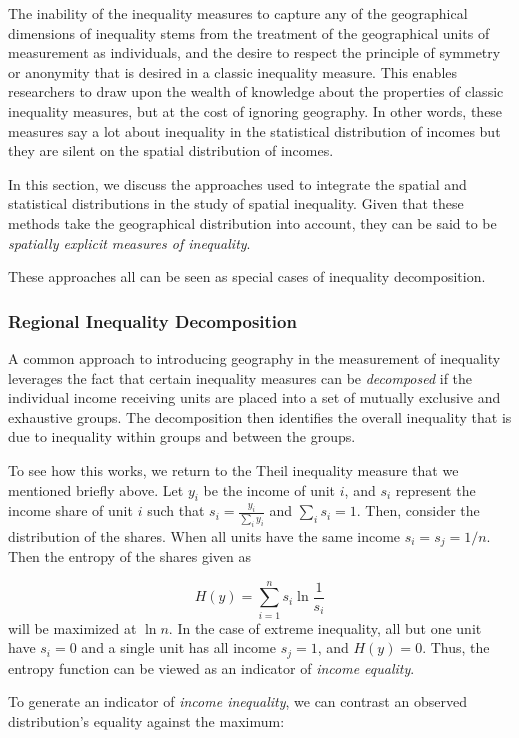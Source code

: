 \documentclass[
  a4paper, 
  twoside,
  final
]{article}
\begin{document}
The inability of the inequality measures to capture any of the
geographical dimensions of inequality stems from the treatment of the
geographical units of measurement as individuals, and the desire to
respect the principle of symmetry or anonymity that is desired in a
classic inequality measure. This enables researchers to draw upon the
wealth of knowledge about the properties of classic inequality measures,
but at the cost of ignoring geography. In other words, these measures
say a lot about inequality in the statistical distribution of incomes
but they are silent on the spatial distribution of incomes.

In this section, we discuss the approaches used to integrate the spatial
and statistical distributions in the study of spatial inequality. Given
that these methods take the geographical distribution into account, they
can be said to be \emph{spatially explicit measures of inequality}.

These approaches all can be seen as special cases of inequality
decomposition.

\subsubsection{Regional Inequality
Decomposition}\label{regional-inequality-decomposition}

A common approach to introducing geography in the measurement of
inequality leverages the fact that certain inequality measures can be
\emph{decomposed} if the individual income receiving units are placed
into a set of mutually exclusive and exhaustive groups. The
decomposition then identifies the overall inequality that is due to
inequality within groups and between the groups.

To see how this works, we return to the Theil inequality measure that we
mentioned briefly above. Let \(y_i\) be the income of unit \(i\), and
\(s_i\) represent the income share of unit \(i\) such that
\(s_i = \frac{y_i}{\sum_i y_i}\) and \(\sum_i s_i=1\). Then, consider
the distribution of the shares. When all units have the same income
\(s_i = s_j =
1/n\). Then the entropy of the shares given as

\[ H(y) = \sum_{i=1}^n s_i \ln \frac{1}{s_i}\] will be maximized at
\(\ln n\). In the case of extreme inequality, all but one unit have
\(s_i=0\) and a single unit has all income \(s_j=1\), and \(H(y)=0\).
Thus, the entropy function can be viewed as an indicator of \emph{income
equality}.

To generate an indicator of \emph{income inequality}, we can contrast an
observed distribution's equality against the maximum:
\end{document}
